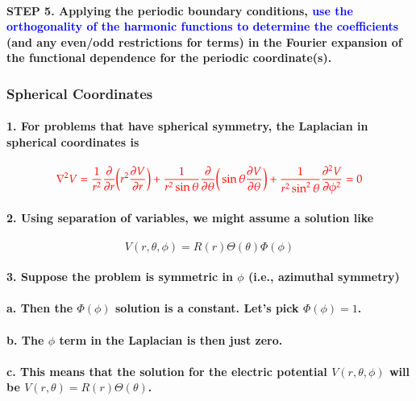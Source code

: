 \documentclass{article}
\begin{document}
\paragraph{\indent STEP 5. Applying the periodic boundary conditions, \textcolor{blue}{use the orthogonality of the harmonic functions to determine the coefficients} (and any even/odd restrictions for terms) in the Fourier expansion of the functional dependence for the periodic coordinate(s).}
\subsubsection{Spherical Coordinates}
\paragraph{1. For problems that have spherical symmetry, the Laplacian in spherical coordinates is}
\begin{equation*}
    \textcolor{red}{\nabla^2V=\frac{1}{r^2}\frac{\partial}{\partial r}\bigg(r^2\frac{\partial V}{\partial r}\bigg) + \frac{1}{r^2\sin\theta}\frac{\partial}{\partial \theta}\bigg(\sin\theta\frac{\partial V}{\partial\theta}\bigg)+\frac{1}{r^2\sin^2\theta}\frac{\partial^2V}{\partial \phi^2}=0}
\end{equation*}
\paragraph{2. Using separation of variables, we might assume a solution like}
\begin{equation*}
    V(r,\theta,\phi)=R(r)\Theta(\theta)\Phi(\phi)
\end{equation*}
\paragraph{3. Suppose the problem is symmetric in $\phi$ (i.e., azimuthal symmetry)}
\paragraph{\indent a. Then the $\Phi(\phi)$ solution is a constant. Let's pick $\Phi(\phi)=1$.}
\paragraph{\indent b. The $\phi$ term in the Laplacian is then just zero.}
\paragraph{\indent c. This means that the solution for the electric potential $V(r,\theta,\phi)$ will be $V(r,\theta)=R(r)\Theta(\theta)$.}
\end{document}
